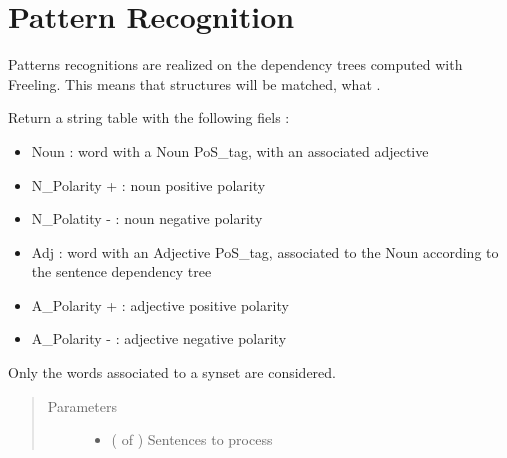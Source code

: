 \documentclass[letterpaper,10pt,english]{sphinxmanual}
\begin{document}
\section{Pattern Recognition}
\label{\detokenize{analysis:module-loacore.analysis.pattern_recognition}}\label{\detokenize{analysis:pattern-recognition}}
Patterns recognitions are realized on the dependency trees computed with Freeling. This means that 
structures will be matched, what .

\begin{fulllineitems}
\label{\detokenize{analysis:loacore.analysis.pattern_recognition.adj_pattern_table}}
Return a string table with the following fiels :
\begin{itemize}
\item {} 
Noun : word with a Noun PoS\_tag, with an associated adjective

\item {} 
N\_Polarity + : noun positive polarity

\item {} 
N\_Polatity - : noun negative polarity

\item {} 
Adj : word with an Adjective PoS\_tag, associated to the Noun according to the sentence dependency tree

\item {} 
A\_Polarity + : adjective positive polarity

\item {} 
A\_Polarity - : adjective negative polarity

\end{itemize}

Only the words associated to a synset are considered.
\begin{quote}\begin{description}
\item[{Parameters}] \leavevmode\begin{itemize}
\item {} 
 ( of {\hyperref[\detokenize{classes:loacore.classes.classes.Sentence}]{}}) \textendash{} Sentences to process


\end{itemize}
\end{description}
\end{quote}
\end{fulllineitems}
\end{document}
